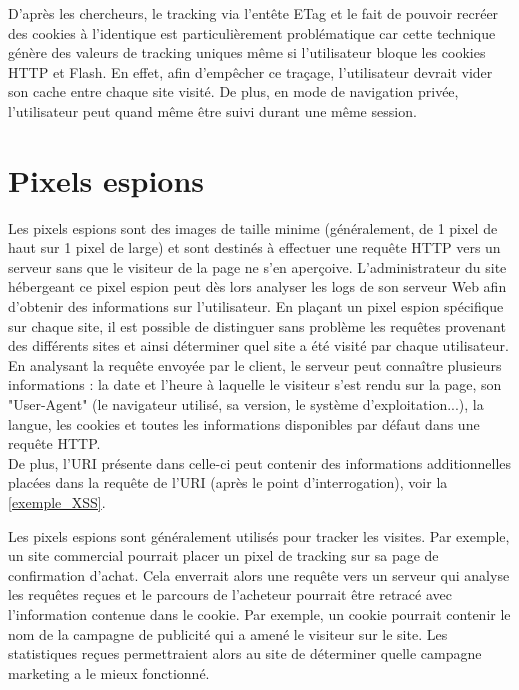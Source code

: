 D'après les chercheurs, le tracking via l'entête ETag et le fait de pouvoir recréer des cookies à l'identique est particulièrement problématique car cette technique génère des valeurs de tracking uniques même si l'utilisateur bloque les cookies HTTP et Flash. En effet, afin d'empêcher ce traçage, l'utilisateur devrait vider son cache entre chaque site visité. De plus, en mode de navigation privée, l'utilisateur peut quand même être suivi durant une même session.

\section{Pixels espions}
\label{pixels_espions}
Les pixels espions sont des images de taille minime (généralement, de 1 pixel de haut sur 1 pixel de large) et sont destinés à effectuer une requête HTTP vers un serveur sans que le visiteur de la page ne s'en aperçoive. L'administrateur du site hébergeant ce pixel espion peut dès lors analyser les logs de son serveur Web afin d'obtenir des informations sur l'utilisateur. En plaçant un pixel espion spécifique sur chaque site, il est possible de distinguer sans problème les requêtes provenant des différents sites et ainsi déterminer quel site a été visité par chaque utilisateur.
En analysant la requête envoyée par le client, le serveur peut connaître plusieurs informations : la date et l'heure à laquelle le visiteur s'est rendu sur la page, son "User-Agent" (le navigateur utilisé, sa version, le système d'exploitation...), la langue, les cookies et toutes les informations disponibles par défaut dans une requête HTTP.\\
De plus, l'URI présente dans celle-ci peut contenir des informations additionnelles placées dans la requête de l'URI (après le point d'interrogation), voir la \autoref{exemple_XSS}.
\newline

Les pixels espions sont généralement utilisés pour tracker les visites. Par exemple, un site commercial pourrait placer un pixel de tracking sur sa page de confirmation d'achat. Cela enverrait alors une requête vers un serveur qui analyse les requêtes reçues et le parcours de l'acheteur pourrait être retracé avec l'information contenue dans le cookie. Par exemple, un cookie pourrait contenir le nom de la campagne de publicité qui a amené le visiteur sur le site. Les statistiques reçues permettraient alors au site de déterminer quelle campagne marketing a le mieux fonctionné.

